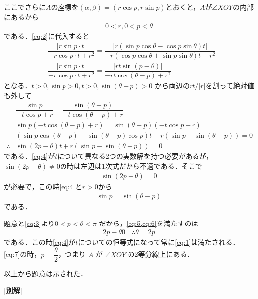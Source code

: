 \documentclass[../../main.tex]{subfiles}
\begin{document}
ここでさらに$A$の座標を$(\alpha,\beta)=(r\cos p,r\sin p)$とおくと，$A$が$\angle XOY$の内部にあるから
\begin{align}
  0 < r, 0 < p < \theta \label{eq:3}
\end{align}
である．\cref{eq:2}に代入すると
\begin{align}
  &\dfrac{|r\sin p \cdot t|}{-r\cos p \cdot t + r^2}
  = \dfrac{|r(\sin p \cos \theta - \cos p \sin \theta ) t|}{-r(\cos p \cos \theta + \sin p \sin \theta) t + r^2} \\
  &\dfrac{|r\sin p \cdot t|}{-r\cos p \cdot t + r^2}
  = \dfrac{|rt\sin(p-\theta)|}{-rt\cos(\theta-p) + r^2}
\end{align}
となる．$t > 0, \sin p > 0, t > 0, \sin(\theta-p) > 0$ から両辺の$rt/|r|$を割って絶対値も外して
\begin{align}
  &\dfrac{\sin p }{-t\cos p + r}
  = \dfrac{\sin(\theta-p)}{-t\cos(\theta-p) + r} \\
  & \sin p (-t\cos(\theta-p) + r) = \sin(\theta-p)(-t\cos p + r) \\
  & \left(\sin p \cos(\theta-p) - \sin(\theta-p)\cos p\right) t + r\left(\sin p - \sin(\theta-p )\right) = 0 \\
  \therefore
  & \sin(2p - \theta) t + r\left(\sin p - \sin(\theta-p)\right) = 0 \label{eq:4}
\end{align}
である．\cref{eq:4}が$t$について異なる2つの実数解を持つ必要があるが，
$\sin(2p - \theta) \neq 0$の時は左辺は$1$次式だから不適である．そこで
\begin{align}
  \sin(2p - \theta) = 0 \label{eq:5}
\end{align}
が必要で，この時\cref{eq:4}と$r>0$から
\begin{align}
  \sin p = \sin(\theta - p) \label{eq:6}
\end{align}
である．

題意と\cref{eq:3}より$0 < p < \theta < \pi$ だから，\cref{eq:5,eq:6}を満たすのは
\begin{align}
  2p - \theta 0 \quad \therefore \theta = 2p \label{eq:7}
\end{align}
である．この時\cref{eq:4}が$t$についての恒等式になって常に\cref{eq:1}は満たされる．
\cref{eq:7}の時，$p = \dfrac{\theta}{2}$，つまり $A$ が $\angle XOY$ の2等分線上にある．

以上から題意は示された．

{\bf [別解]}
\end{document}
